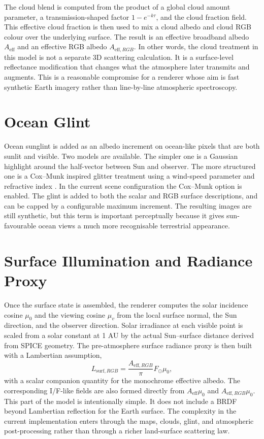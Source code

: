 \documentclass[12pt,a4paper]{article}
\begin{document}
The cloud blend is computed from the product of a global cloud amount parameter, a transmission-shaped factor \(1 - e^{-k\tau}\), and the cloud fraction field. This effective cloud fraction is then used to mix a cloud albedo and cloud RGB colour over the underlying surface. The result is an effective broadband albedo \(A_{\mathrm{eff}}\) and an effective RGB albedo \(A_{\mathrm{eff},RGB}\). In other words, the cloud treatment in this model is not a separate 3D scattering calculation. It is a surface-level reflectance modification that changes what the atmosphere later transmits and augments. This is a reasonable compromise for a renderer whose aim is fast synthetic Earth imagery rather than line-by-line atmospheric spectroscopy.

\section{Ocean Glint}
Ocean sunglint is added as an albedo increment on ocean-like pixels that are both sunlit and visible. Two models are available. The simpler one is a Gaussian highlight around the half-vector between Sun and observer. The more structured one is a Cox--Munk inspired glitter treatment using a wind-speed parameter and refractive index \parencite{cox1954}. In the current scene configuration the Cox--Munk option is enabled. The glint is added to both the scalar and RGB surface descriptions, and can be capped by a configurable maximum increment. The resulting images are still synthetic, but this term is important perceptually because it gives sun-favourable ocean views a much more recognisable terrestrial appearance.

\section{Surface Illumination and Radiance Proxy}
Once the surface state is assembled, the renderer computes the solar incidence cosine \(\mu_0\) and the viewing cosine \(\mu_v\) from the local surface normal, the Sun direction, and the observer direction. Solar irradiance at each visible point is scaled from a solar constant at 1 AU by the actual Sun--surface distance derived from SPICE geometry. The pre-atmosphere surface radiance proxy is then built with a Lambertian assumption,
\[
L_{\mathrm{surf},RGB} = \frac{A_{\mathrm{eff},RGB}}{\pi} F_{\odot} \mu_0,
\]
with a scalar companion quantity for the monochrome effective albedo. The corresponding I/F-like fields are also formed directly from \(A_{\mathrm{eff}}\mu_0\) and \(A_{\mathrm{eff},RGB}\mu_0\). This part of the model is intentionally simple. It does not include a BRDF beyond Lambertian reflection for the Earth surface. The complexity in the current implementation enters through the maps, clouds, glint, and atmospheric post-processing rather than through a richer land-surface scattering law.
\end{document}
